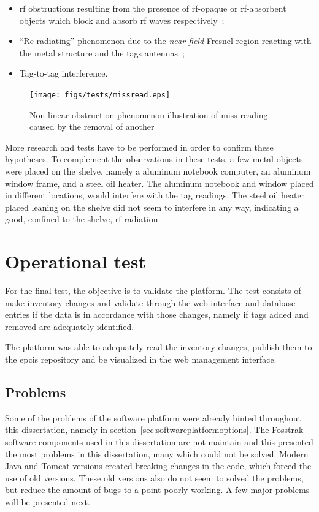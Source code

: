 \begin{itemize}
    \item \ac{rf} obstructions resulting from the presence of \ac{rf}-opaque or \ac{rf}-absorbent objects which block and absorb \ac{rf} waves respectively~\cite{lahiriRFIDSourcebook2005};
    \item ``Re-radiating'' phenomenon due to the \emph{near-field} Fresnel region reacting with the metal structure and the tags antennas~\cite{ElectromagneticRadiationField};
    \item Tag-to-tag interference.
\end{itemize}

\begin{figure}
    \centering
    \texttt{[image: figs/tests/missread.eps]}
    \caption{Non linear obstruction phenomenon illustration of miss reading caused by the removal of another}
    \label{fig:missreading}
\end{figure}

More research and tests have to be performed in order to confirm these hypotheses.
To complement the observations in these tests, a few metal objects were placed on the shelve, namely a aluminum notebook computer, an aluminum window frame, and a steel oil heater.
The aluminum notebook and window placed in different locations, would interfere with the tag readings. The steel oil heater placed leaning on the shelve did not seem to interfere in any way, indicating a good, confined to the shelve, \ac{rf} radiation.

\section{Operational test}

For the final test, the objective is to validate the platform.
The test consists of make inventory changes and validate through the web interface and database entries if the data is in accordance with those changes, namely if tags added and removed are adequately identified.

The platform was able to adequately read the inventory changes, publish them to the \ac{epcis} repository and be visualized in the web management interface.

\subsection{Problems}

Some of the problems of the software platform were already hinted throughout this dissertation, namely in section~\ref{sec:softwareplatformoptions}.
The Fosstrak software components used in this dissertation are not maintain and this presented the most problems in this dissertation, many which could not be solved.
Modern Java and Tomcat versions created breaking changes in the code, which forced the use of old versions. 
These old versions also do not seem to solved the problems, but reduce the amount of bugs to a point poorly working. A few major problems will be presented next.

